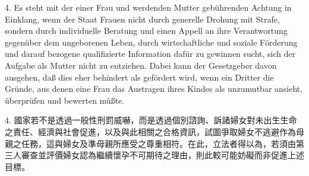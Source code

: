 \documentclass[12pt]{article}
\begin{document}
\begin{sourcepara}[title={原文D.77}]
4. Es steht mit der einer Frau und werdenden Mutter gebührenden Achtung in Einklang, wenn der Staat Frauen nicht durch generelle Drohung mit Strafe, sondern durch individuelle Beratung und einen Appell an ihre Verantwortung gegenüber dem ungeborenen Leben, durch wirtschaftliche und soziale Förderung und darauf bezogene qualifizierte Information dafür zu gewinnen sucht, sich der Aufgabe als Mutter nicht zu entziehen. Dabei kann der Gesetzgeber davon ausgehen, daß dies eher behindert als gefördert wird, wenn ein Dritter die Gründe, aus denen eine Frau das Austragen ihres Kindes als unzumutbar ansieht, überprüfen und bewerten müßte.
\end{sourcepara}
\begin{transpara}
4. 國家若不是透過一般性刑罰威嚇，而是透過個別諮詢、訴諸婦女對未出生生命之責任、經濟與社會促進，以及與此相關之合格資訊，試圖爭取婦女不逃避作為母親之任務，這與婦女及準母親所應受之尊重相符。在此，立法者得以為，若須由第三人審查並評價婦女認為繼續懷孕不可期待之理由，則此較可能妨礙而非促進上述目標。
\end{transpara}
\end{document}

